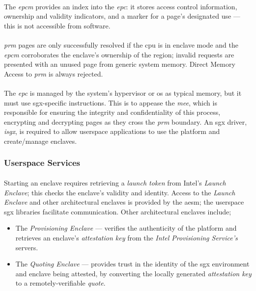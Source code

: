 \paragraph{} The \textit{\acrshort{epcm}} provides an index into the \textit{\acrshort{epc}}: it stores access control information, ownership and validity indicators, and a marker for a page's designated use --- this is not accessible from software. 

\paragraph{} \textit{\acrshort{prm}} pages are only successfully resolved if the \acrshort{cpu} is in enclave mode and the \textit{\acrshort{epcm}} corroborates the enclave's ownership of the region; invalid requests are presented with an unused page from generic system memory. Direct Memory Access to \textit{\acrshort{prm}} is always rejected.

\paragraph{} The \textit{\acrshort{epc}} is managed by the system's hypervisor or \acrshort{os} as typical memory, but it must use \acrshort{sgx}-specific instructions. This is to appease the \textit{\acrshort{mee}}, which is responsible for ensuring the integrity and confidentiality of this process, encrypting and decrypting pages as they cross the \textit{\acrshort{prm}} boundary. An \acrshort{sgx} driver, \textit{isgx}, is required to allow userspace applications to use the platform and create/manage enclaves.


\subsubsection{Userspace Services}
\paragraph{} Starting an enclave requires retrieving a \textit{launch token} from Intel's \textit{Launch Enclave}; this checks the enclave's validity and identity. Access to the \textit{Launch Enclave} and other architectural enclaves is provided by the \acrfull{aesm}; the userspace \acrshort{sgx} libraries facilitate communication. Other architectural enclaves include;

\begin{itemize}
    \item The \textit{Provisioning Enclave} --- verifies the authenticity of the platform and retrieves an enclave's \textit{attestation key} from the \textit{Intel Provisioning Service's} servers.
    \item The \textit{Quoting Enclave} --- provides trust in the identity of the \acrshort{sgx} environment and enclave being attested, by converting the locally generated \textit{attestation key} to a remotely-verifiable \textit{quote}.
\end{itemize}

